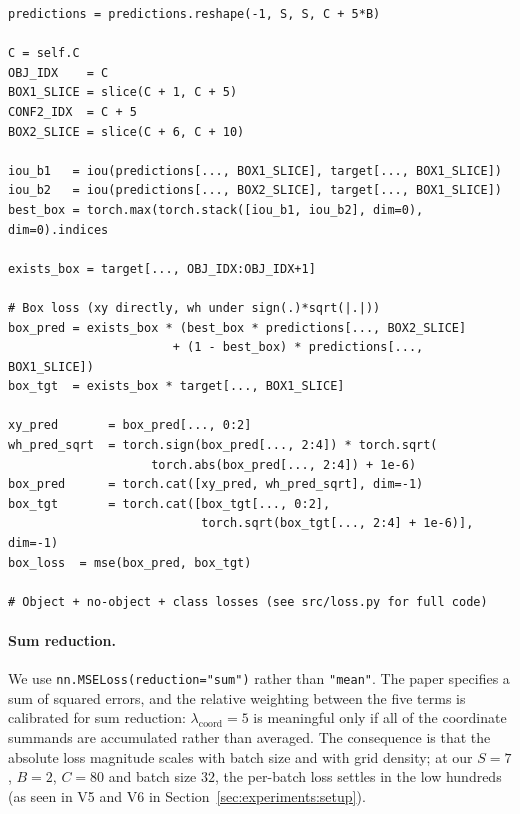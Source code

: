 \begin{lstlisting}[caption={Body of \texttt{YoloLoss.forward}, abbreviated for
brevity. Auxiliary index variables and the IoU-based responsibility mask are
omitted; the full source is in \texttt{src/loss.py}.},
label=lst:loss-body]
predictions = predictions.reshape(-1, S, S, C + 5*B)

C = self.C
OBJ_IDX    = C
BOX1_SLICE = slice(C + 1, C + 5)
CONF2_IDX  = C + 5
BOX2_SLICE = slice(C + 6, C + 10)

iou_b1   = iou(predictions[..., BOX1_SLICE], target[..., BOX1_SLICE])
iou_b2   = iou(predictions[..., BOX2_SLICE], target[..., BOX1_SLICE])
best_box = torch.max(torch.stack([iou_b1, iou_b2], dim=0), dim=0).indices

exists_box = target[..., OBJ_IDX:OBJ_IDX+1]

# Box loss (xy directly, wh under sign(.)*sqrt(|.|))
box_pred = exists_box * (best_box * predictions[..., BOX2_SLICE]
                       + (1 - best_box) * predictions[..., BOX1_SLICE])
box_tgt  = exists_box * target[..., BOX1_SLICE]

xy_pred       = box_pred[..., 0:2]
wh_pred_sqrt  = torch.sign(box_pred[..., 2:4]) * torch.sqrt(
                    torch.abs(box_pred[..., 2:4]) + 1e-6)
box_pred      = torch.cat([xy_pred, wh_pred_sqrt], dim=-1)
box_tgt       = torch.cat([box_tgt[..., 0:2],
                           torch.sqrt(box_tgt[..., 2:4] + 1e-6)], dim=-1)
box_loss  = mse(box_pred, box_tgt)

# Object + no-object + class losses (see src/loss.py for full code)
\end{lstlisting}

\paragraph{Sum reduction.} We use \texttt{nn.MSELoss(reduction="sum")} rather
than \texttt{"mean"}. The paper specifies a sum of squared errors, and the
relative weighting between the five terms is calibrated for sum reduction:
$\lambda_{\text{coord}} = 5$ is meaningful only if all of the coordinate
summands are accumulated rather than averaged. The consequence is that the
absolute loss magnitude scales with batch size and with grid density; at our
$S = 7$, $B = 2$, $C = 80$ and batch size $32$, the per-batch loss settles in
the low hundreds (as seen in V5 and V6 in
Section~\ref{sec:experiments:setup}).

